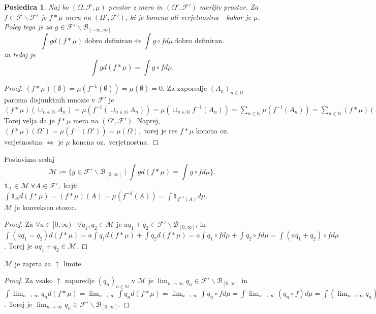 \documentclass[a4paper,12pt]{article}
\theoremstyle{definition} %
\theoremstyle{plain} %
\newtheorem{posledica}[definicija]{Posledica}
\newcommand{\N}{\mathbb{N}}
\newcommand{\F}{\mathcal{F}}
\begin{document}
            \begin{posledica}
                Naj bo $(\Omega, \F, \mu)$ prostor z mero in $(\Omega', \F')$ merljiv prostor. Za $f \in \F\backslash\F'$ je
                $f*\mu$ mera na $(\Omega', \F')$, ki je koncna ali verjetnostna - kakor je $\mu$. Poleg tega je za $g \in \F'\backslash\mathcal{B}_{[-\infty, \infty]}$
                $$
                    \int g d(f*\mu) \ \text{dobro definiran} \iff \int g \circ f d\mu \ \text{dobro definiran}.
                $$
                in tedaj je 
                $$
                    \int g d(f*\mu) = \int g \circ f d\mu.
                $$
            \end{posledica}

            \begin{proof}
                $(f*\mu)(\emptyset) = \mu(f^{-1}(\emptyset)) = \mu(\emptyset) = 0.$
                Za zaporedje $(A_n)_{n \in \N}$ paroma disjunktnih mnozic v $\F'$ je 
                $(f*\mu)(\cup_{n\in\N}A_n) = \mu(f^{-1}(\cup_{n \in \N}A_n)) = \mu(\cup_{n\in\N}f^{-1}(A_n)) = \sum_{n\in\N}\mu(f^{-1}(A_n)) = \sum_{n\in\N}(f*\mu)(A_n).$	
                Torej velja da je $f*\mu$ mera na $(\Omega', \F')$.
                Naprej, $(f*\mu)(\Omega') = \mu(f^{-1}(\Omega')) = \mu(\Omega),$ torej je res $f*\mu$ koncna oz. verjetnostna
                $\iff$ je $\mu$ koncna oz.\ verjetnostna.
            \end{proof}

            Postavimo sedaj
            $$
            \mathcal{M} := \{g \in \F'\backslash\mathcal{B}_{[0, \infty]} \mid \int gd(f* \mu) = \int g \circ f d\mu\}.
            $$
            $\mathds{1}_A \in \mathcal{M} \ \forall A \in \F',$ kajti $\int \mathds{1}_Ad(f*\mu) = (f*\mu)(A) = \mu(f^{-1}(A)) = \int\mathds{1}_{f^{-1}(A)}d\mu$. \\
            $\mathcal{M}$ je konveksen stozec.
            \begin{proof}
                Za $\forall a \in [0, \infty)$ \ $\forall q_1, q_2 \in \mathcal{M}$ je $aq_1 + q_2 \in \F'\backslash\mathcal{B}_{[0, \infty]}$, in
                $\int (aq_1 = q_2)d(f*\mu) = a\int q_1d(f*\mu) + \int q_2d(f*\mu) = a\int q_1 \circ fd\mu + \int q_2 \circ fd\mu = \int (aq_1 + q_2)\circ fd\mu$. 
                Torej je $aq_1 + q_2 \in \mathcal{M}$.
            \end{proof}

            $\mathcal{M}$ je zaprta za $\uparrow$ limite.
            \begin{proof}
                Za vsako $\uparrow$ zaporedje $(q_n)_{n \in \N}$ v $\mathcal{M}$ je $\lim_{n \rightarrow \infty}q_n \in \F'\backslash\mathcal{B}_{[0, \infty]}$ in
                $\int \lim_{n\rightarrow\infty}q_nd(f*\mu) = \lim_{n\rightarrow\infty}\int q_nd(f*\mu) = \lim_{n\rightarrow\infty}\int q_n\circ f d\mu = \int \lim_{n\rightarrow\infty}(q_n\circ f)d\mu = \int(\lim_{n\rightarrow\infty}q_n)\circ fd\mu$.
                Torej je $\lim_{n\rightarrow\infty}q_n \in \F'\backslash\mathcal{B}_{[0, \infty]}$.
            \end{proof}
\end{document}
